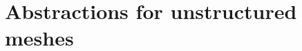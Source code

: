 \documentclass[thesis]{subfiles}
\begin{document}



\section{Abstractions for unstructured meshes}


%
%
%
%
%
\end{document}
